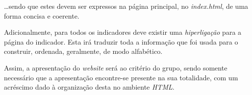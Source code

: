 \dots sendo que estes devem ser expressos na página principal, no \textit{index.html}, de uma forma concisa e coerente.

Adicionalmente, para todos os indicadores deve existir uma \textit{hiperligação} para a página do indicador. 
Esta irá traduzir toda a informação que foi usada para o construir, ordenada, geralmente, de modo alfabético.

Assim, a apresentação do \textit{website} será ao critério do grupo, sendo somente necessário que a apresentação 
encontre-se presente na sua totalidade, com um acréscimo dado à organização desta no ambiente \textit{HTML}.
